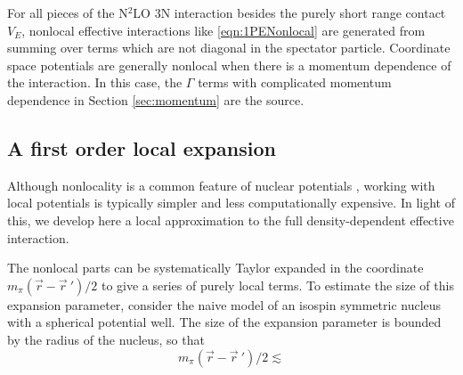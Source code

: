 \documentclass[%
 preprint,
 amsmath,amssymb,
 aps,
]{revtex4-1}
\begin{document}
For all pieces of the N$^2$LO 3N interaction besides the purely short range contact $V_E$, nonlocal effective interactions like \eqref{eqn:1PENonlocal} are generated from summing over terms which are not diagonal in the spectator particle. Coordinate space potentials are generally nonlocal when there is a momentum dependence of the interaction. In this case, the $\Gamma$ terms with complicated momentum dependence in Section \ref{sec:momentum} are the source.

\subsection{A first order local expansion}

Although nonlocality is a common feature of nuclear potentials \cite{PhysRevC.53.R1483}, working with local potentials is typically simpler and less computationally expensive. In light of this, we develop here a local approximation to the full density-dependent effective interaction.

The nonlocal parts can be systematically Taylor expanded in the coordinate $m_\pi(\vec{r}-\vec{r}\:')/2$ to give a series of purely local terms. To estimate the size of this expansion parameter, consider the naive model of an isospin symmetric nucleus with a spherical potential well. The size of the expansion parameter is bounded by the radius of the nucleus, so that 
\begin{equation}
m_\pi(\vec{r}-\vec{r}\:')/2 \lesssim 
\end{equation}


\end{document}

